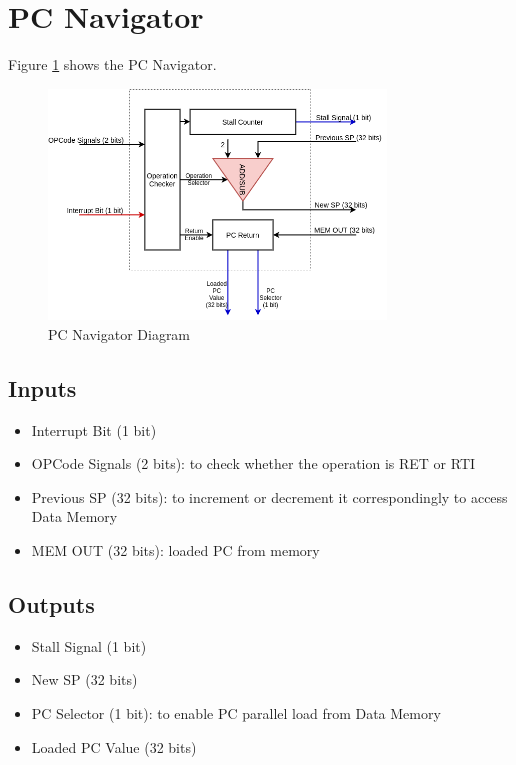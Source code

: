 \section{PC Navigator}
Figure \ref{fig:pc_nav} shows the PC Navigator.

\begin{figure}[hp]
    \centering
    \includegraphics[width=0.8\textwidth]{images/pc_nav.png}
    \caption{PC Navigator Diagram}
    \label{fig:pc_nav}
\end{figure}

\subsection{Inputs}
\begin{itemize}
    \item Interrupt Bit (1 bit)
    \item OPCode Signals (2 bits): to check whether the operation is RET or RTI
    \item Previous SP (32 bits): to increment or decrement it correspondingly to access Data Memory
    \item MEM OUT (32 bits): loaded PC from memory
\end{itemize}

\subsection{Outputs}
\begin{itemize}
    \item Stall Signal (1 bit)
    \item New SP (32 bits)
    \item PC Selector (1 bit): to enable PC parallel load from Data Memory
    \item Loaded PC Value (32 bits)
\end{itemize}

